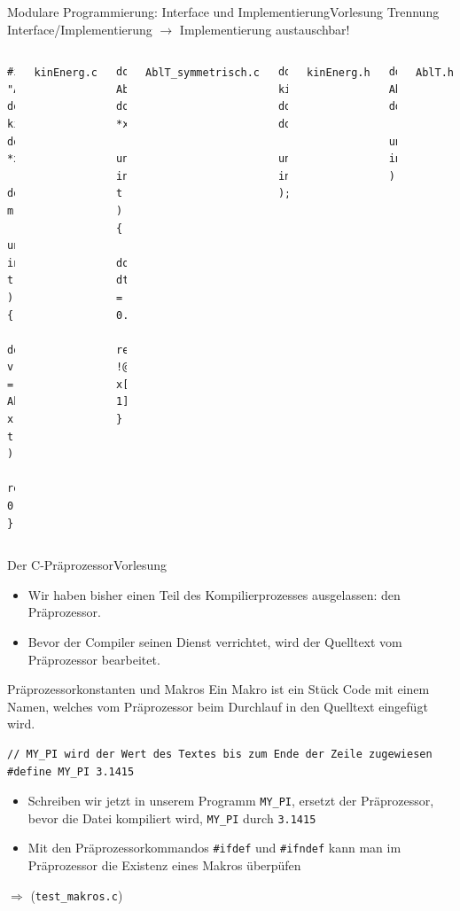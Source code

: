 \documentclass[xcolor=dvipsnames]{beamer}
\newcounter{lecturecounter}
\begin{document}
\begin{frame}[fragile]{Modulare Programmierung: Interface und Implementierung}{Vorlesung }
Trennung Interface/Implementierung $\rightarrow$ Implementierung austauschbar!
\begin{columns}[T]
    \begin{lstlisting}
#include "AblT.h"
double 
kinEnerg( double *x, 
          double m, 
          unsigned int t ) {
  double v = AblT( x, t );
  return 0.5*m*v*v;
}
    \end{lstlisting}
    \texttt{kinEnerg.c}
    \vspace{0.1cm}
    \begin{lstlisting}
double AblT( double *x, 
             unsigned int t ){
  double dt = 0.01;
  return !@(x[t+1]-x[t-1])/(2*dt)!@;
}
    \end{lstlisting}
    \texttt{AblT\_symmetrisch.c}
    \begin{lstlisting}
double kinEnerg( double*, double,
                 unsigned int );
    \end{lstlisting}
    \texttt{kinEnerg.h}
    \vspace{2.4cm}
    \begin{lstlisting}
double AblT( double*, 
             unsigned int );
    \end{lstlisting}
    \texttt{AblT.h}  
  \end{columns}
\end{frame}

\begin{frame}[fragile]{Der C-Präprozessor}{Vorlesung }
\begin{block}{}
  \begin{itemize}
    \item{Wir haben bisher einen Teil des Kompilierprozesses ausgelassen: den Präprozessor.}
    \item{Bevor der Compiler seinen Dienst verrichtet, wird der Quelltext vom Präprozessor bearbeitet.}
  \end{itemize}
\end{block}
\begin{block}{Präprozessorkonstanten und Makros}
  Ein Makro ist ein Stück Code mit einem Namen, welches vom Präprozessor beim Durchlauf in den Quelltext eingefügt wird.
\end{block}
\begin{lstlisting}
// MY_PI wird der Wert des Textes bis zum Ende der Zeile zugewiesen
#define MY_PI 3.1415
\end{lstlisting}
\begin{itemize}
  \item{Schreiben wir jetzt in unserem Programm \verb|MY_PI|, ersetzt der Präprozessor, bevor die Datei kompiliert wird, \verb|MY_PI| durch \texttt{3.1415}}
  \item{Mit den Präprozessorkommandos \verb|#ifdef| und \verb|#ifndef| kann man im Präprozessor die Existenz eines Makros überpüfen}
\end{itemize}
$\Rightarrow$ (\verb|test_makros.c|)
\end{frame}
\end{document}
